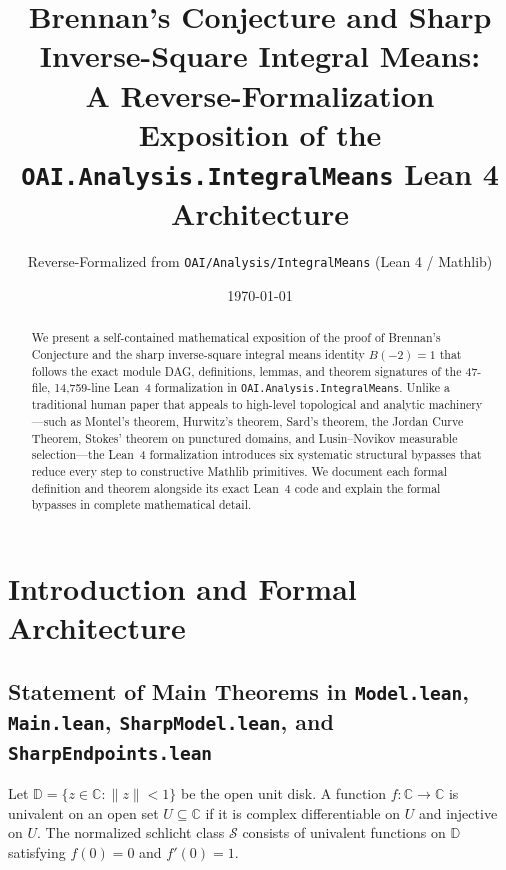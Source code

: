 \documentclass[11pt,reqno]{amsart}
\title[Brennan's Conjecture Following the Lean 4 Formalization]{Brennan's Conjecture and Sharp Inverse-Square Integral Means:\\ A Reverse-Formalization Exposition of the \texttt{OAI.Analysis.IntegralMeans} Lean 4 Architecture}
\author{Reverse-Formalized from \texttt{OAI/Analysis/IntegralMeans} (Lean 4 / Mathlib)}
\date{\today}
\theoremstyle{definition}
\newcommand{\D}{\mathbb{D}}
\newcommand{\C}{\mathbb{C}}
\newcommand{\Sclass}{\mathcal{S}}
\begin{document}
\begin{abstract}
We present a self-contained mathematical exposition of the proof of Brennan's Conjecture and the sharp inverse-square integral means identity $B(-2)=1$ that follows the exact module DAG, definitions, lemmas, and theorem signatures of the 47-file, 14,759-line Lean~4 formalization in \texttt{OAI.Analysis.IntegralMeans}. Unlike a traditional human paper that appeals to high-level topological and analytic machinery---such as Montel's theorem, Hurwitz's theorem, Sard's theorem, the Jordan Curve Theorem, Stokes' theorem on punctured domains, and Lusin--Novikov measurable selection---the Lean~4 formalization introduces six systematic structural bypasses that reduce every step to constructive Mathlib primitives. We document each formal definition and theorem alongside its exact Lean~4 code and explain the formal bypasses in complete mathematical detail.
\end{abstract}

\maketitle
\tableofcontents

\section{Introduction and Formal Architecture}

\subsection{Statement of Main Theorems in \texttt{Model.lean}, \texttt{Main.lean}, \texttt{SharpModel.lean}, and \texttt{SharpEndpoints.lean}}

Let $\D = \{z \in \C : \|z\| < 1\}$ be the open unit disk. A function $f : \C \to \C$ is univalent on an open set $U \subseteq \C$ if it is complex differentiable on $U$ and injective on $U$. The normalized schlicht class $\Sclass$ consists of univalent functions on $\D$ satisfying $f(0)=0$ and $f'(0)=1$.
\end{document}
